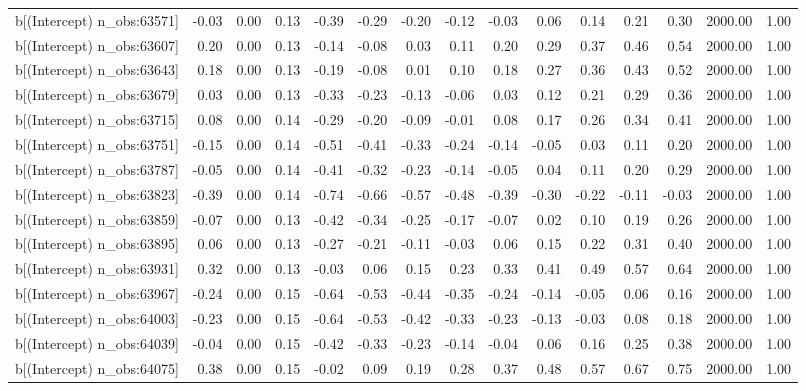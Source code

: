 \begin{table}[ht]
\begin{tabular}{rrrrrrrrrrrrrrr}
  b[(Intercept) n\_obs:63571] & -0.03 & 0.00 & 0.13 & -0.39 & -0.29 & -0.20 & -0.12 & -0.03 & 0.06 & 0.14 & 0.21 & 0.30 & 2000.00 & 1.00 \\ 
  b[(Intercept) n\_obs:63607] & 0.20 & 0.00 & 0.13 & -0.14 & -0.08 & 0.03 & 0.11 & 0.20 & 0.29 & 0.37 & 0.46 & 0.54 & 2000.00 & 1.00 \\ 
  b[(Intercept) n\_obs:63643] & 0.18 & 0.00 & 0.13 & -0.19 & -0.08 & 0.01 & 0.10 & 0.18 & 0.27 & 0.36 & 0.43 & 0.52 & 2000.00 & 1.00 \\ 
  b[(Intercept) n\_obs:63679] & 0.03 & 0.00 & 0.13 & -0.33 & -0.23 & -0.13 & -0.06 & 0.03 & 0.12 & 0.21 & 0.29 & 0.36 & 2000.00 & 1.00 \\ 
  b[(Intercept) n\_obs:63715] & 0.08 & 0.00 & 0.14 & -0.29 & -0.20 & -0.09 & -0.01 & 0.08 & 0.17 & 0.26 & 0.34 & 0.41 & 2000.00 & 1.00 \\ 
  b[(Intercept) n\_obs:63751] & -0.15 & 0.00 & 0.14 & -0.51 & -0.41 & -0.33 & -0.24 & -0.14 & -0.05 & 0.03 & 0.11 & 0.20 & 2000.00 & 1.00 \\ 
  b[(Intercept) n\_obs:63787] & -0.05 & 0.00 & 0.14 & -0.41 & -0.32 & -0.23 & -0.14 & -0.05 & 0.04 & 0.11 & 0.20 & 0.29 & 2000.00 & 1.00 \\ 
  b[(Intercept) n\_obs:63823] & -0.39 & 0.00 & 0.14 & -0.74 & -0.66 & -0.57 & -0.48 & -0.39 & -0.30 & -0.22 & -0.11 & -0.03 & 2000.00 & 1.00 \\ 
  b[(Intercept) n\_obs:63859] & -0.07 & 0.00 & 0.13 & -0.42 & -0.34 & -0.25 & -0.17 & -0.07 & 0.02 & 0.10 & 0.19 & 0.26 & 2000.00 & 1.00 \\ 
  b[(Intercept) n\_obs:63895] & 0.06 & 0.00 & 0.13 & -0.27 & -0.21 & -0.11 & -0.03 & 0.06 & 0.15 & 0.22 & 0.31 & 0.40 & 2000.00 & 1.00 \\ 
  b[(Intercept) n\_obs:63931] & 0.32 & 0.00 & 0.13 & -0.03 & 0.06 & 0.15 & 0.23 & 0.33 & 0.41 & 0.49 & 0.57 & 0.64 & 2000.00 & 1.00 \\ 
  b[(Intercept) n\_obs:63967] & -0.24 & 0.00 & 0.15 & -0.64 & -0.53 & -0.44 & -0.35 & -0.24 & -0.14 & -0.05 & 0.06 & 0.16 & 2000.00 & 1.00 \\ 
  b[(Intercept) n\_obs:64003] & -0.23 & 0.00 & 0.15 & -0.64 & -0.53 & -0.42 & -0.33 & -0.23 & -0.13 & -0.03 & 0.08 & 0.18 & 2000.00 & 1.00 \\ 
  b[(Intercept) n\_obs:64039] & -0.04 & 0.00 & 0.15 & -0.42 & -0.33 & -0.23 & -0.14 & -0.04 & 0.06 & 0.16 & 0.25 & 0.38 & 2000.00 & 1.00 \\ 
  b[(Intercept) n\_obs:64075] & 0.38 & 0.00 & 0.15 & -0.02 & 0.09 & 0.19 & 0.28 & 0.37 & 0.48 & 0.57 & 0.67 & 0.75 & 2000.00 & 1.00 \\ 

\end{tabular}
\end{table}
